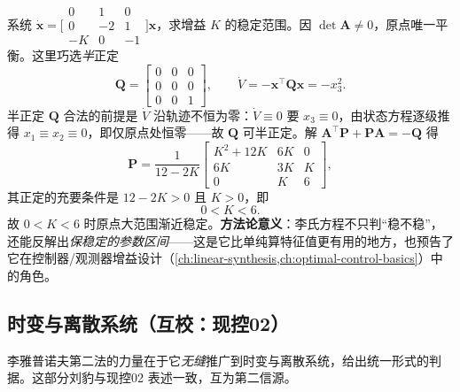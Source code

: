 \begin{example}\label{ex:lyap-param}
系统 $\dot{\mathbf{x}}=\big[\begin{smallmatrix}0&1&0\\0&-2&1\\-K&0&-1\end{smallmatrix}\big]\mathbf{x}$，求增益 $K$ 的稳定范围。因 $\det\mathbf{A}\neq0$，原点唯一平衡。这里巧选\emph{半}正定
\[
  \mathbf{Q}=\begin{bmatrix}0&0&0\\0&0&0\\0&0&1\end{bmatrix},\qquad
  \dot V=-\mathbf{x}^\top\mathbf{Q}\mathbf{x}=-x_3^2.
\]
半正定 $\mathbf{Q}$ 合法的前提是 $\dot V$ 沿轨迹不恒为零：$\dot V\equiv0$ 要 $x_3\equiv0$，由状态方程逐级推得 $x_1\equiv x_2\equiv0$，即仅原点处恒零——故 $\mathbf{Q}$ 可半正定。解 $\mathbf{A}^\top\mathbf{P}+\mathbf{P}\mathbf{A}=-\mathbf{Q}$ 得
\[
  \mathbf{P}=\frac{1}{12-2K}\begin{bmatrix}K^2+12K&6K&0\\6K&3K&K\\0&K&6\end{bmatrix},
\]
其正定的充要条件是 $12-2K>0$ 且 $K>0$，即
\[
  0<K<6.
\]
故 $0<K<6$ 时原点大范围渐近稳定。\textbf{方法论意义}：李氏方程不只判“稳不稳”，还能反解出\emph{保稳定的参数区间}——这是它比单纯算特征值更有用的地方，也预告了它在控制器/观测器增益设计（\cref{ch:linear-synthesis,ch:optimal-control-basics}）中的角色。
\end{example}

\subsection{时变与离散系统（互校：现控02）}
\label{sec:lyap-tv-disc}

李雅普诺夫第二法的力量在于它\emph{无缝}推广到时变与离散系统，给出统一形式的判据。这部分刘豹与现控02 表述一致，互为第二信源。

